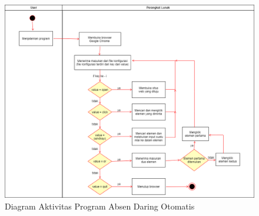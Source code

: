 \begin{figure}[H]
	\centering
	\includegraphics[scale=0.5]{Gambar/ActivityAplikasi.png}
	\caption{Diagram Aktivitas Program Absen Daring Otomatis} 
	\label{fig:ActivityAplikasi}
\end{figure}

